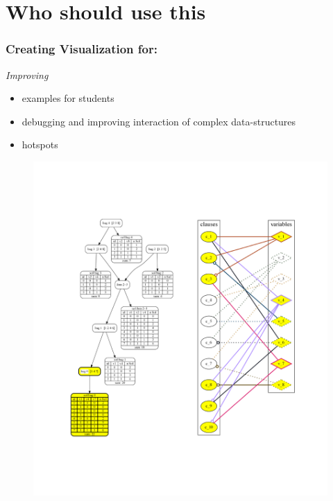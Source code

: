\documentclass[c,8pt,xcolor...,x11names]{beamer}
\begin{document}
\section{Who should use this}
\begin{frame}
	\frametitle{Creating Visualization for:}
	\begin{minipage}{0.44\textwidth}
		\emph{Improving}
		\begin{itemize}
			\item examples for students
			\item debugging and improving interaction of complex data-structures
			\item hotspots
		\end{itemize}\medskip
		
	\end{minipage}
	\begin{minipage}{0.55\textwidth}
		\begin{figure}
			\includegraphics[width=\linewidth]{images/combined8.png}
		\end{figure}
	\end{minipage}
	
\end{frame}
\end{document}
